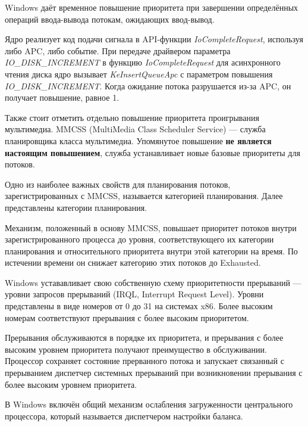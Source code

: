 Windows даёт временное повышение приоритета при завершении определённых
операций ввода-вывода потокам, ожидающих ввод-вывод.


Ядро реализует код подачи сигнала в API-функции \textit{IoCompleteRequest},
используя либо APC, либо событие. При передаче драйвером параметра 
\textit{IO\_DISK\_INCREMENT}
в функцию \textit{IoCompleteRequest}
для асинхронного чтения диска ядро вызывает \textit{KeInsertQueueApc} 
с параметром повышения \textit{IO\_DISK\_INCREMENT}. Когда ожидание потока 
разрушается из-за APC, он получает повышение, равное 1.

Также стоит отметить отдельно повышение приоритета проигрывания
мультимедиа. MMCSS (MultiMedia Class Scheduler Service) --- 
служба планировщика класса мультимедиа. Упомянутое повышение 
\textbf{не является настоящим повышением}, служба устанавливает
новые базовые приоритеты для потоков. 

Одно из наиболее важных свойств для планирования потоков, 
зарегистрированных с MMCSS, называется
категорией планирования. Далее представлены категории планирования.


Механизм, положенный в основу MMCSS, повышает приоритет потоков
внутри зарегистрированного процесса до уровня, соответствующего 
их категории планирования и относительного приоритета внутри этой 
категории на время. По истечении времени он снижает категорию 
этих потоков до Exhausted.

Windows устававливает свою собственную схему приоритетности 
прерываний --- уровни запросов прерываний (IRQL, Interrupt Request Level).
Уровни представлены в виде номеров от 0 до 31 на системах x86. Более высоким номерам 
соответствуют прерывания с более высоким приоритетом.


Прерывания обслуживаются в порядке их приоритета, и прерывания с более 
высоким уровнем приоритета получают преимущество в обслуживании. Процессор
сохраняет состояние прерванного потока и запускает связанный 
с прерыванием диспетчер системных прерываний при возникновении прерывания
с более высоким уровнем приоритета. 

В Windows включён общий механизм ослабления загруженности центрального 
процессора, который называется диспетчером настройки баланса.

